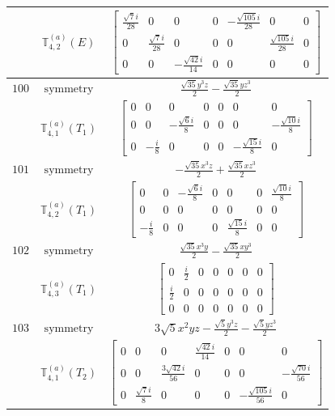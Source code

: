 \documentclass[fleqn,8pt,landscape]{jsarticle}
\begin{document}
\begin{longtable}{ccc}
$  $ & $ \mathbb{T}_{4,2}^{(a)}(E) $ & $ \begin{bmatrix} \frac{\sqrt{7} i}{28} & 0 & 0 & 0 & - \frac{\sqrt{105} i}{28} & 0 & 0 \\ 0 & \frac{\sqrt{7} i}{28} & 0 & 0 & 0 & \frac{\sqrt{105} i}{28} & 0 \\ 0 & 0 & - \frac{\sqrt{42} i}{14} & 0 & 0 & 0 & 0 \end{bmatrix} $ \\ \hline
$ 100 $ & $ \text{symmetry} $ & $ \frac{\sqrt{35} y^{3} z}{2} - \frac{\sqrt{35} y z^{3}}{2} $ \\
$  $ & $ \mathbb{T}_{4,1}^{(a)}(T_{1}) $ & $ \begin{bmatrix} 0 & 0 & 0 & 0 & 0 & 0 & 0 \\ 0 & 0 & - \frac{\sqrt{6} i}{8} & 0 & 0 & 0 & - \frac{\sqrt{10} i}{8} \\ 0 & - \frac{i}{8} & 0 & 0 & 0 & - \frac{\sqrt{15} i}{8} & 0 \end{bmatrix} $ \\ \hline
$ 101 $ & $ \text{symmetry} $ & $ - \frac{\sqrt{35} x^{3} z}{2} + \frac{\sqrt{35} x z^{3}}{2} $ \\
$  $ & $ \mathbb{T}_{4,2}^{(a)}(T_{1}) $ & $ \begin{bmatrix} 0 & 0 & - \frac{\sqrt{6} i}{8} & 0 & 0 & 0 & \frac{\sqrt{10} i}{8} \\ 0 & 0 & 0 & 0 & 0 & 0 & 0 \\ - \frac{i}{8} & 0 & 0 & 0 & \frac{\sqrt{15} i}{8} & 0 & 0 \end{bmatrix} $ \\ \hline
$ 102 $ & $ \text{symmetry} $ & $ \frac{\sqrt{35} x^{3} y}{2} - \frac{\sqrt{35} x y^{3}}{2} $ \\
$  $ & $ \mathbb{T}_{4,3}^{(a)}(T_{1}) $ & $ \begin{bmatrix} 0 & \frac{i}{2} & 0 & 0 & 0 & 0 & 0 \\ \frac{i}{2} & 0 & 0 & 0 & 0 & 0 & 0 \\ 0 & 0 & 0 & 0 & 0 & 0 & 0 \end{bmatrix} $ \\ \hline
$ 103 $ & $ \text{symmetry} $ & $ 3 \sqrt{5} x^{2} y z - \frac{\sqrt{5} y^{3} z}{2} - \frac{\sqrt{5} y z^{3}}{2} $ \\
$  $ & $ \mathbb{T}_{4,1}^{(a)}(T_{2}) $ & $ \begin{bmatrix} 0 & 0 & 0 & \frac{\sqrt{42} i}{14} & 0 & 0 & 0 \\ 0 & 0 & \frac{3 \sqrt{42} i}{56} & 0 & 0 & 0 & - \frac{\sqrt{70} i}{56} \\ 0 & \frac{\sqrt{7} i}{8} & 0 & 0 & 0 & - \frac{\sqrt{105} i}{56} & 0 \end{bmatrix} $ \\ \hline

\end{longtable}
\end{document}
